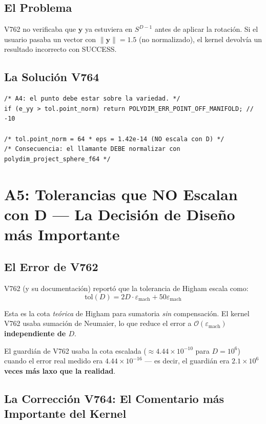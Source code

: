 \subsection{El Problema}

V762 no verificaba que $\mathbf{y}$ ya estuviera en $S^{D-1}$ antes de aplicar la rotación.
Si el usuario pasaba un vector con $\|{\mathbf{y}\|} = 1.5$ (no normalizado), el kernel
devolvía un resultado incorrecto con SUCCESS.

\subsection{La Solución V764}

\begin{verbatim}
/* A4: el punto debe estar sobre la variedad. */
if (e_yy > tol.point_norm) return POLYDIM_ERR_POINT_OFF_MANIFOLD; // -10

/* tol.point_norm = 64 * eps = 1.42e-14 (NO escala con D) */
/* Consecuencia: el llamante DEBE normalizar con polydim_project_sphere_f64 */
\end{verbatim}

\section{A5: Tolerancias que NO Escalan con D --- La Decisión de Diseño más Importante}

\subsection{El Error de V762}

V762 (y su documentación) reportó que la tolerancia de Higham escala como:
\begin{equation}
\text{tol}(D) = 2D \cdot \varepsilon_{\text{mach}} + 50\varepsilon_{\text{mach}}
\end{equation}

Esta es la cota \textit{teórica} de Higham para sumatoria \textit{sin} compensación.
El kernel V762 usaba sumación de Neumaier, lo que reduce el error a
$\mathcal{O}(\varepsilon_{\text{mach}})$ \textbf{independiente de $D$}.

El guardián de V762 usaba la cota escalada ($\approx 4.44 \times 10^{-10}$ para $D=10^6$)
cuando el error real medido era $4.44 \times 10^{-16}$ --- es decir, el guardián era
\textbf{$2.1 \times 10^{6}$ veces más laxo que la realidad}.

\subsection{La Corrección V764: El Comentario más Importante del Kernel}


